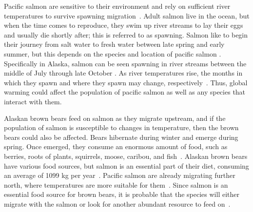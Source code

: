 Pacific salmon are sensitive to their environment and rely on sufficient river temperatures to survive spawning migration~\cite{ADFG}.
Adult salmon live in the ocean, but when the time comes to reproduce, they swim up river streams to lay their eggs and usually die shortly after; this is referred to as spawning. 
Salmon like to begin their journey from salt water to fresh water between late spring and early summer, but this depends on the species and location of pacific salmon \cite{ADFG}.
Specifically in Alaska, salmon can be seen spawning in river streams between the middle of July through late October \cite{lisi2013association}.
As river temperatures rise, the months in which they spawn and where they spawn may change, respectively~\cite{taylor2008climate}.
Thus, global warming could affect the population of pacific salmon as well as any species that interact with them. 

Alaskan brown bears feed on salmon as they migrate upstream, and if the population of salmon is susceptible to changes in temperature, then the brown bears could also be affected.
Bears hibernate during winter and emerge during spring. 
Once emerged, they consume an enormous amount of food, such as berries, roots of plants, squirrels, moose, caribou, and fish~\cite{ADFG}.
Alaskan brown bears have various food sources, but salmon is an essential part of their diet, consuming an average of 1099 kg per year~\cite{deacy2018phenological,hilderbrand1999effect}. 
Pacific salmon are already migrating further north, where temperatures are more suitable for them~\cite{taylor2008climate}.
Since salmon is an essential food source for brown bears, it is probable that the species will either migrate with the salmon or look for another abundant resource to feed on~\cite{hilderbrand1999effect}.

